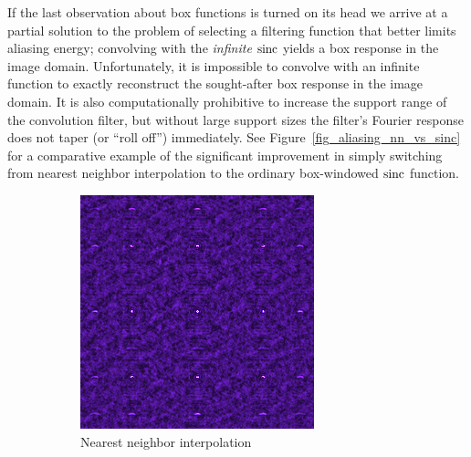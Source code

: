  
 If the last observation about box functions is turned on its head we arrive at a partial solution to the problem of selecting a filtering function
 that better limits aliasing energy; convolving with the \emph{infinite} $\operatorname*{sinc}$ yields a box response in the image domain. Unfortunately, it is 
 impossible to convolve with an infinite function to exactly reconstruct the sought-after box response in the image domain. It is also computationally
 prohibitive to increase the support range of the convolution filter, but without large support sizes the filter's Fourier response does not taper (or 
 ``roll off'') immediately. See Figure~\ref{fig_aliasing_nn_vs_sinc} for a comparative example of the significant improvement in simply switching from 
 nearest neighbor interpolation to the ordinary box-windowed $\operatorname*{sinc}$ function.
 \begin{figure}[h]
  \begin{mdframed}
    \centering
    \begin{subfigure}[b]{0.35\textwidth}
      \includegraphics[width=\textwidth]{images/ratt_aa_kernel_demo_nn.png}
      \caption{Nearest neighbor interpolation}
    \end{subfigure}
    \begin{subfigure}[b]{0.35\textwidth}

\end{subfigure}
\end{mdframed}
\end{figure}
